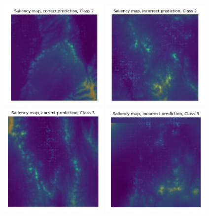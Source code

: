 \documentclass{article}[12pt]
\begin{document}
\begin{center}
    \includegraphics[width=0.4\textwidth]{images/correct_2.png}
    \includegraphics[width=0.4\textwidth]{images/incorrect_2.png}\\
    \includegraphics[width=0.4\textwidth]{images/correct_3.png}
    \includegraphics[width=0.4\textwidth]{images/incorrect_3.png}\\
\end{center}
\end{document}
